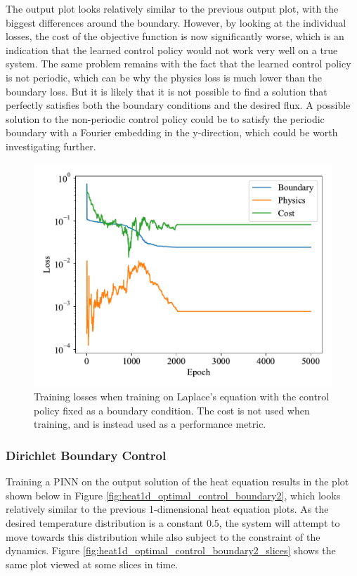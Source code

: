 The output plot looks relatively similar to the previous output plot, with the biggest differences around the boundary. However, by looking at the individual losses, the cost of the objective function is now significantly worse, which is an indication that the learned control policy would not work very well on a true system. The same problem remains with the fact that the learned control policy is not periodic, which can be why the physics loss is much lower than the boundary loss. But it is likely that it is not possible to find a solution that perfectly satisfies both the boundary conditions and the desired flux. A possible solution to the non-periodic control policy could be to satisfy the periodic boundary with a Fourier embedding in the y-direction, which could be worth investigating further.

\begin{figure}[H]
    \centering
    \includegraphics[width=1.0\linewidth]{Figures/IntermediateExperiments/OptimalControl/laplace_optimal_control_losses_validate.pdf}
    \caption{Training losses when training on Laplace's equation with the control policy fixed as a boundary condition. The cost is not used when training, and is instead used as a performance metric.}
    \label{fig:laplace_optimal_control_losses_validate}
\end{figure}

\subsubsection{Dirichlet Boundary Control}

Training a PINN on the output solution of the heat equation results in the plot shown below in Figure \ref{fig:heat1d_optimal_control_boundary2}, which looks relatively similar to the previous 1-dimensional heat equation plots. As the desired temperature distribution is a constant $0.5$, the system will attempt to move towards this distribution while also subject to the constraint of the dynamics. Figure \ref{fig:heat1d_optimal_control_boundary2_slices} shows the same plot viewed at some slices in time.

